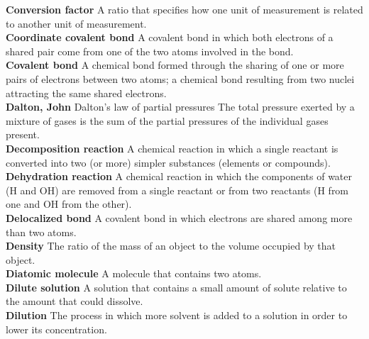 \documentclass[10pt, roman]{article}
\begin{document}
\begin{minipage}[c]{0.30\textwidth}
\textbf{Conversion factor} A ratio that specifies how one unit of measurement is related to another unit of measurement. \\
\textbf{Coordinate covalent bond} A covalent bond in which both electrons of a shared pair come from one of the two atoms involved in the bond. \\
\textbf{Covalent bond} A chemical bond formed through the sharing of one or more pairs of electrons between two atoms; a chemical bond resulting from two nuclei attracting the same shared electrons. \\
\textbf{Dalton, John} Dalton’s law of partial pressures The total pressure exerted by a mixture of gases is the sum of the partial pressures of the individual gases present. \\
\textbf{Decomposition reaction} A chemical reaction in which a single reactant is converted into two (or more) simpler substances (elements or compounds). \\
\textbf{Dehydration reaction} A chemical reaction in which the components of water (H and OH) are removed from a single reactant or from two reactants (H from one and OH from the other). \\
\textbf{Delocalized bond} A covalent bond in which electrons are shared among more than two atoms. \\
\textbf{Density} The ratio of the mass of an object to the volume occupied by that object. \\
\textbf{Diatomic molecule} A molecule that contains two atoms. \\
\textbf{Dilute solution} A solution that contains a small amount of solute relative to the amount that could dissolve. \\
\textbf{Dilution} The process in which more solvent is added to a solution in order to lower its concentration. \\
\end{minipage}%
\newpage
\end{document}
